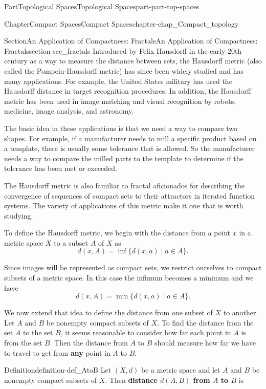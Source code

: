 \documentclass[oneside,10pt,]{book}
\newcommand{\terminology}[1]{\textbf{#1}}
\numberwithin{equation}{chapter}
\begin{document}
\begin{partptx}{Part}{Topological Spaces}{}{Topological Spaces}{}{}{part-part-top-spaces}
\begin{chapterptx}{Chapter}{Compact Spaces}{}{Compact Spaces}{}{}{chapter-chap_Compact_topology}
\begin{sectionptx}{Section}{An Application of Compactness: Fractals}{}{An Application of Compactness: Fractals}{}{}{section-sec_fractals}
Introduced by Felix Hausdorff in the early 20th century as a way to measure the distance between sets, the Hausdorff metric (also called the Pompeiu-Hausdorff metric) has since been widely studied and has many applications. For example, the United States military has used the Hausdorff distance in target recognition procedures. In addition, the Hausdorff metric has been used in image matching and visual recognition by robots, medicine, image analysis, and astronomy.%
\par
The basic idea in these applications is that we need a way to compare two shapes. For example, if a manufacturer needs to mill a specific product based on a template, there is usually some tolerance that is allowed. So the manufacturer needs a way to compare the milled parts to the template to determine if the tolerance has been met or exceeded.%
\par
The Hausdorff metric is also familiar to fractal aficionados for describing the convergence of sequences of compact sets to their attractors in iterated function systems. The variety of applications of this metric make it one that is worth studying.%
\par
To define the Hausdorff metric, we begin with the distance from a point \(x\) in a metric space \(X\) to a subset \(A\) of \(X\) as%
\begin{equation*}
d(x,A) = \inf\{d(x,a) \mid a \in A\}\text{.}
\end{equation*}
%
\par
Since images will be represented as compact sets, we restrict ourselves to compact subsets of a metric space. In this case the infimum becomes a minimum and we have%
\begin{equation*}
d(x,A) = \min\{d(x,a) \mid a \in A\}\text{.}
\end{equation*}
%
\par
We now extend that idea to define the distance from one subset of \(X\) to another. Let \(A\) and \(B\) be nonempty compact subsets of \(X\). To find the distance from the set \(A\) to the set \(B\), it seems reasonable to consider how far each point in \(A\) is from the set \(B\). Then the distance from \(A\) to \(B\) should measure how far we have to travel to get from \terminology{any} point in \(A\) to \(B\).%
\begin{definition}{Definition}{}{definition-def_AtoB}%
Let \((X,d)\) be a metric space and let \(A\) and \(B\) be nonempty compact subsets of \(X\). Then \terminology{distance \(d(A,B)\) from \(A\) to \(B\)} is%
\begin{equation*}

\end{equation*}
\end{definition}
\end{sectionptx}
\end{chapterptx}
\end{partptx}
\end{document}
